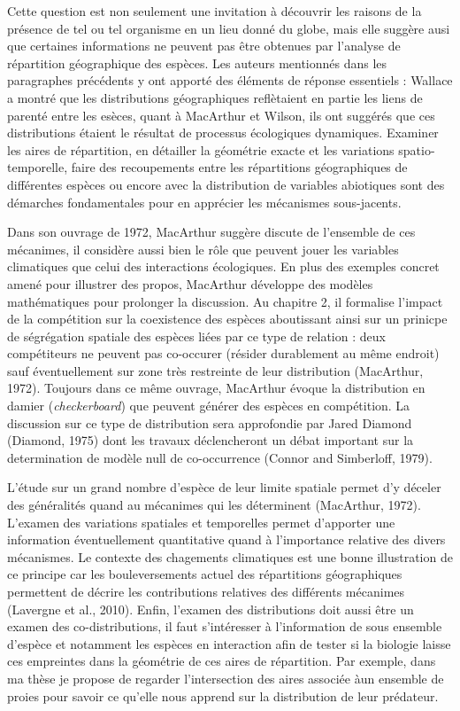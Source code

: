 Cette question est non seulement une invitation à découvrir les raisons
de la présence de tel ou tel organisme en un lieu donné du globe, mais
elle suggère ausi que certaines informations ne peuvent pas être
obtenues par l'analyse de répartition géographique des espèces. Les
auteurs mentionnés dans les paragraphes précédents y ont apporté des
éléments de réponse essentiels : Wallace a montré que les distributions
géographiques reflètaient en partie les liens de parenté entre les
esèces, quant à MacArthur et Wilson, ils ont suggérés que ces
distributions étaient le résultat de processus écologiques dynamiques.
Examiner les aires de répartition, en détailler la géométrie exacte et
les variations spatio-temporelle, faire des recoupements entre les
répartitions géographiques de différentes espèces ou encore avec la
distribution de variables abiotiques sont des démarches fondamentales
pour en apprécier les mécanismes sous-jacents.

Dans son ouvrage de 1972, MacArthur suggère discute de l'ensemble de ces
mécanimes, il considère aussi bien le rôle que peuvent jouer les
variables climatiques que celui des interactions écologiques. En plus
des exemples concret amené pour illustrer des propos, MacArthur
développe des modèles mathématiques pour prolonger la discussion. Au
chapitre 2, il formalise l'impact de la compétition sur la coexistence
des espèces aboutissant ainsi sur un prinicpe de ségrégation spatiale
des espèces liées par ce type de relation : deux compétiteurs ne peuvent
pas co-occurer (résider durablement au même endroit) sauf éventuellement
sur zone très restreinte de leur distribution (MacArthur, 1972).
Toujours dans ce même ouvrage, MacArthur évoque la distribution en
damier (\emph{checkerboard}) que peuvent générer des espèces en
compétition. La discussion sur ce type de distribution sera approfondie
par Jared Diamond (Diamond, 1975) dont les travaux déclencheront un
débat important sur la determination de modèle null de co-occurrence
(Connor and Simberloff, 1979).

L'étude sur un grand nombre d'espèce de leur limite spatiale permet d'y
déceler des généralités quand au mécanimes qui les déterminent
(MacArthur, 1972). L'examen des variations spatiales et temporelles
permet d'apporter une information éventuellement quantitative quand à
l'importance relative des divers mécanismes. Le contexte des chagements
climatiques est une bonne illustration de ce principe car les
bouleversements actuel des répartitions géographiques permettent de
décrire les contributions relatives des différents mécanimes (Lavergne
et al., 2010). Enfin, l'examen des distributions doit aussi être un
examen des co-distributions, il faut s'intéresser à l'information de
sous ensemble d'espèce et notamment les espèces en interaction afin de
tester si la biologie laisse ces empreintes dans la géométrie de ces
aires de répartition. Par exemple, dans ma thèse je propose de regarder
l'intersection des aires associée àun ensemble de proies pour savoir ce
qu'elle nous apprend sur la distribution de leur prédateur.

